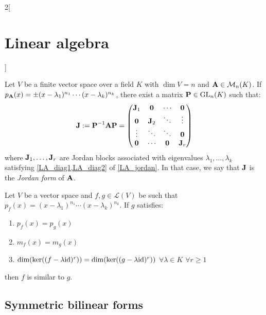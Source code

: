 \documentclass[../../../main_math.tex]{subfiles}
\begin{document}
\begin{multicols}{2}[\section{Linear algebra}]
\begin{proposition}
\begin{enumerate}
    \end{enumerate}
  \end{proposition}
  \begin{proposition}
    Let $V$ be a finite vector space over a field $K$ with $\dim V=n$ and $\boldsymbol{\mathrm{A}}\in\mathcal{M}_n(K)$. If $p_{\boldsymbol{\mathrm{A}}}(x)=\pm(x-\lambda_1)^{n_1}\cdots(x-\lambda_k)^{n_k}$, there exist a matrix $\boldsymbol{\mathrm{P}}\in\mathrm{GL}_n(K)$ such that:
    $$\boldsymbol{\mathrm{J}}:=\boldsymbol{\mathrm{P}}^{-1}\boldsymbol{\mathrm{A}}\boldsymbol{\mathrm{P}}=
      \begin{pmatrix}
        \boldsymbol{\mathrm{J}}_1 & \boldsymbol{\mathrm{0}}   & \cdots & \boldsymbol{\mathrm{0}}   \\
        \boldsymbol{\mathrm{0}}   & \boldsymbol{\mathrm{J}}_2 & \ddots & \vdots   \\
        \vdots   & \ddots   & \ddots & \boldsymbol{\mathrm{0}}   \\
        \boldsymbol{\mathrm{0}}   & \cdots   & \boldsymbol{\mathrm{0}} & \boldsymbol{\mathrm{J}}_r \\
      \end{pmatrix}
    $$
    where $\boldsymbol{\mathrm{J}}_1,\ldots,\boldsymbol{\mathrm{J}}_r$ are Jordan blocks associated with eigenvalues $\lambda_1,\ldots,\lambda_k$ satisfying \cref{LA_diag1,LA_diag2} of \cref{LA_jordan}. In that case, we say that $\boldsymbol{\mathrm{J}}$ is the \emph{Jordan form} of $\boldsymbol{\mathrm{A}}$.
  \end{proposition}
  \begin{theorem}
    Let $V$ be a vector space and $f,g\in\mathcal{L}(V)$ be such that $p_f(x)=(x-\lambda_1)^{n_1}\cdots(x-\lambda_k)^{n_k}$. If $g$ satisfies:
    \begin{enumerate}
      \item $p_f(x)=p_g(x)$
      \item $m_f(x)=m_g(x)$
      \item $\dim(\ker((f-\lambda \mathrm{id})^r))=\dim(\ker((g-\lambda \mathrm{id})^r))$ $\forall\lambda\in K$ $\forall r\geq 1$
    \end{enumerate}
    then $f$ is similar to $g$.
  \end{theorem}
  \subsection{Symmetric bilinear forms}

\end{multicols}
\end{document}
